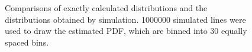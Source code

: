 \begin{figure}[tbp]
\begin{center}
    \caption{\label{fig:sim_vs_exact}Comparisons of exactly calculated
      distributions and the distributions obtained by simulation. 
      1000000 simulated lines were used to draw the estimated PDF,
      which are binned into 30 equally spaced bins.}
  \end{center} 
\vspace{-4mm}
\end{figure}



\begin{figure}[tbp]
  \begin{center}


\end{center}
\end{figure}
